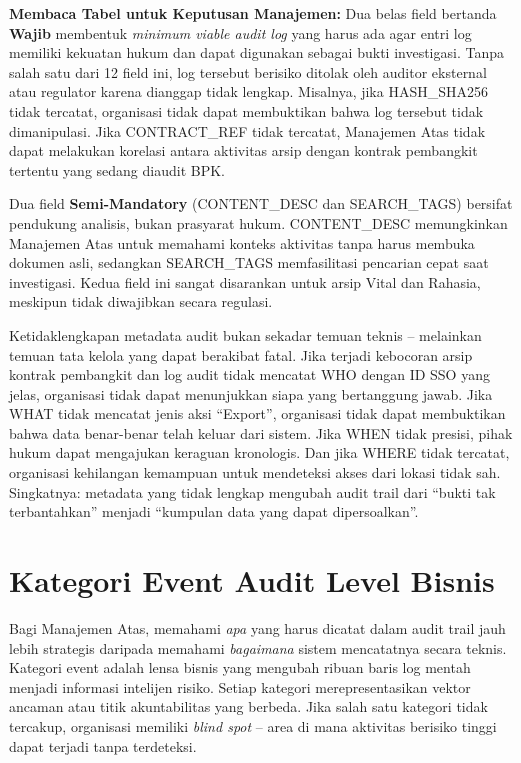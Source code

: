 \documentclass[12pt,a4paper]{report}
\begin{document}
\noindent\textbf{Membaca Tabel untuk Keputusan Manajemen:} Dua belas field bertanda \textbf{Wajib} membentuk \textit{minimum viable audit log} yang harus ada agar entri log memiliki kekuatan hukum dan dapat digunakan sebagai bukti investigasi. Tanpa salah satu dari 12 field ini, log tersebut berisiko ditolak oleh auditor eksternal atau regulator karena dianggap tidak lengkap. Misalnya, jika HASH\_SHA256 tidak tercatat, organisasi tidak dapat membuktikan bahwa log tersebut tidak dimanipulasi. Jika CONTRACT\_REF tidak tercatat, Manajemen Atas tidak dapat melakukan korelasi antara aktivitas arsip dengan kontrak pembangkit tertentu yang sedang diaudit BPK.

Dua field \textbf{Semi-Mandatory} (CONTENT\_DESC dan SEARCH\_TAGS) bersifat pendukung analisis, bukan prasyarat hukum. CONTENT\_DESC memungkinkan Manajemen Atas untuk memahami konteks aktivitas tanpa harus membuka dokumen asli, sedangkan SEARCH\_TAGS memfasilitasi pencarian cepat saat investigasi. Kedua field ini sangat disarankan untuk arsip Vital dan Rahasia, meskipun tidak diwajibkan secara regulasi.

\begin{plnbox}
Ketidaklengkapan metadata audit bukan sekadar temuan teknis -- melainkan temuan tata kelola yang dapat berakibat fatal. Jika terjadi kebocoran arsip kontrak pembangkit dan log audit tidak mencatat WHO dengan ID SSO yang jelas, organisasi tidak dapat menunjukkan siapa yang bertanggung jawab. Jika WHAT tidak mencatat jenis aksi ``Export'', organisasi tidak dapat membuktikan bahwa data benar-benar telah keluar dari sistem. Jika WHEN tidak presisi, pihak hukum dapat mengajukan keraguan kronologis. Dan jika WHERE tidak tercatat, organisasi kehilangan kemampuan untuk mendeteksi akses dari lokasi tidak sah. Singkatnya: metadata yang tidak lengkap mengubah audit trail dari ``bukti tak terbantahkan'' menjadi ``kumpulan data yang dapat dipersoalkan''.
\end{plnbox}

\section{Kategori Event Audit Level Bisnis}
Bagi Manajemen Atas, memahami \textit{apa} yang harus dicatat dalam audit trail jauh lebih strategis daripada memahami \textit{bagaimana} sistem mencatatnya secara teknis. Kategori event adalah lensa bisnis yang mengubah ribuan baris log mentah menjadi informasi intelijen risiko. Setiap kategori merepresentasikan vektor ancaman atau titik akuntabilitas yang berbeda. Jika salah satu kategori tidak tercakup, organisasi memiliki \textit{blind spot} -- area di mana aktivitas berisiko tinggi dapat terjadi tanpa terdeteksi.
\end{document}
